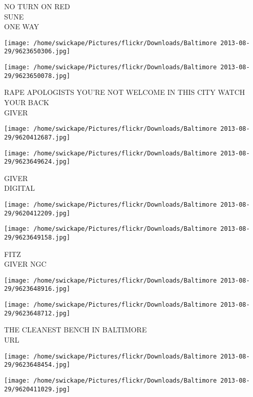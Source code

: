 \documentclass[10pt,letterpaper]{article}
\begin{document}
NO TURN ON RED\\
SUNE\\
ONE WAY\\
\pagebreak

\texttt{[image: /home/swickape/Pictures/flickr/Downloads/Baltimore 2013-08-29/9623650306.jpg]}

\vspace{0.25in}
\texttt{[image: /home/swickape/Pictures/flickr/Downloads/Baltimore 2013-08-29/9623650078.jpg]}

RAPE APOLOGISTS YOU'RE NOT WELCOME IN THIS CITY WATCH YOUR BACK\\
GIVER\\
\pagebreak

\texttt{[image: /home/swickape/Pictures/flickr/Downloads/Baltimore 2013-08-29/9620412687.jpg]}

\vspace{0.25in}
\texttt{[image: /home/swickape/Pictures/flickr/Downloads/Baltimore 2013-08-29/9623649624.jpg]}

GIVER\\
DIGITAL\\
\pagebreak

\texttt{[image: /home/swickape/Pictures/flickr/Downloads/Baltimore 2013-08-29/9620412209.jpg]}

\vspace{0.25in}
\texttt{[image: /home/swickape/Pictures/flickr/Downloads/Baltimore 2013-08-29/9623649158.jpg]}

FITZ\\
GIVER NGC\\
\pagebreak

\texttt{[image: /home/swickape/Pictures/flickr/Downloads/Baltimore 2013-08-29/9623648916.jpg]}

\vspace{0.25in}
\texttt{[image: /home/swickape/Pictures/flickr/Downloads/Baltimore 2013-08-29/9623648712.jpg]}

THE CLEANEST BENCH IN BALTIMORE\\
URL\\
\pagebreak

\texttt{[image: /home/swickape/Pictures/flickr/Downloads/Baltimore 2013-08-29/9623648454.jpg]}

\vspace{0.25in}
\texttt{[image: /home/swickape/Pictures/flickr/Downloads/Baltimore 2013-08-29/9620411029.jpg]}
\end{document}
